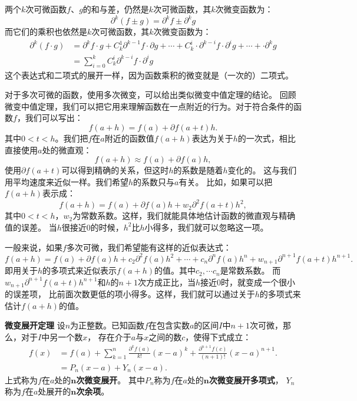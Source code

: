 \documentclass[12pt,UTF8,fontset=none]{ctexbook}
\begin{document}
两个$k$次可微函数$f$、$g$的和与差，仍然是$k$次可微函数，其$k$次微变函数为：
$$ \partial^k (f \pm g) = \partial^k f \pm \partial^k g $$
而它们的乘积也依然是$k$次可微函数，其$k$次微变函数为：
\begin{align*}
    \partial^k (f \cdot g) &= \partial^k f \cdot g + C_k^1 \partial^{k-1} f \cdot \partial g + \cdots + C_k^i \cdot \partial^{k-i} f \cdot  \partial^i g + \cdots + \cdot \partial^{k} g  \\
    &= \sum_{i=0}^k C_k^i \partial^{k-i} f \cdot  \partial^i g 
\end{align*}
这个表达式和二项式的展开一样，因为函数乘积的微变就是（一次的）二项式。

对于多次可微的函数，使用多次微变，可以给出类似微变中值定理的结论。
回顾微变中值定理，我们可以把它用来理解函数在一点附近的行为。对于符合条件的函数$f$，我们可以写出：
$$ f(a + h) = f(a) + \partial f(a + t) h.$$
其中$0<t<h$。我们把$f$在$a$附近的函数值$f(a+h)$表达为关于$h$的一次式，相比直接使用$a$处的微直观：
$$ f(a + h) \approx f(a) + \partial f(a) h,$$
使用$\partial f(a + t)$可以得到精确的关系，但这时$h$的系数是随着$h$变化的。
这与我们用平均速度来近似一样。我们希望$h$的系数只与$a$有关。
比如，如果可以把$f(a + h)$表示成：
$$ f(a + h) = f(a) + \partial f(a) h + w_2\partial^2 f(a + t) h^2,$$
其中$0<t<h$，$w_2$为常数系数。这样，我们就能具体地估计函数的微直观与精确值的误差。
当$h$很接近$0$的时候，$h^2$比$h$小得多，我们就可以忽略这一项。

一般来说，如果$f$多次可微，我们希望能有这样的近似表达式：
$$ f(a + h) = f(a) + \partial f(a) h + c_2 \partial^2 f(a) h^2 + \cdots + c_n \partial^n f(a) h^n + w_{n+1}\partial^{n+1} f(a + t) h^{n+1}.$$
即用关于$h$的多项式来近似表示$f(a + h)$的值。其中$c_2, \cdots c_n$是常数系数。
而$w_{n+1}\partial^{n+1} f(a + t) h^{n+1}$和$h$的$n+1$次方成正比，当$h$接近$0$时，就变成一个很小的误差项，
比前面次数更低的项小得多。这样，我们就可以通过关于$h$的多项式来估计$f(a + h)$的值。

\begin{tm}{\textbf{微变展开定理}}
    设$n$为正整数。已知函数$f$在包含实数$a$的区间$I$中$n+1$次可微，那么，对于$I$中另一个数$x$，
    存在介于$a$与$x$之间的数$c$，使得下式成立：
    \begin{align*}
        f(x) &= f(a) + \sum_{k=1}^n \frac{\partial^k f (a)}{k!}(x - a)^k + \frac{\partial^{n+1} f (c)}{(n+1)!}(x - a)^{n+1}.  \\
        &= P_n(x - a) + Y_n(x - a). 
    \end{align*}
    上式称为$f$在$a$处的$\boldsymbol{n}$\textbf{次微变展开}。
    其中$P_n$称为$f$在$a$处的$\boldsymbol{n}$\textbf{次微变展开多项式}，
    $Y_n$称为$f$在$a$处展开的$\boldsymbol{n}$\textbf{次余项}。
    
\end{tm}
\end{document}
